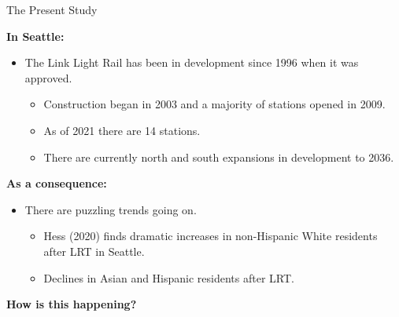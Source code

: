 \documentclass[11pt,ignorenonframetext,]{beamer}
\providecommand{\tightlist}{%
  \setlength{\itemsep}{0pt}\setlength{\parskip}{0pt}}
\begin{document}
\begin{frame}{The Present Study}
\protect\hypertarget{the-present-study}{}

\textbf{In Seattle:}

\begin{itemize}
\tightlist
\item
  The Link Light Rail has been in development since 1996 when it was
  approved.

  \begin{itemize}
  \tightlist
  \item
    Construction began in 2003 and a majority of stations opened in
    2009.
  \item
    As of 2021 there are 14 stations.
  \item
    There are currently north and south expansions in development to
    2036.
  \end{itemize}
\end{itemize}

\textbf{As a consequence:}

\begin{itemize}
\tightlist
\item
  There are puzzling trends going on.

  \begin{itemize}
  \tightlist
  \item
    Hess (2020) finds dramatic increases in non-Hispanic White residents
    after LRT in Seattle.
  \item
    Declines in Asian and Hispanic residents after LRT.
  \end{itemize}
\end{itemize}

\textbf{How is this happening?}

\end{frame}
\end{document}
